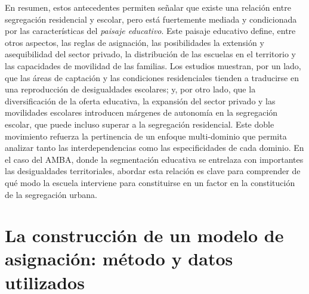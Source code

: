 \documentclass[
  spanish,
  a4paper,%
  chapterprefix=true,%
  DIV=calc,%
  twoside]{scrbook}%
\begin{document}
En resumen, estos antecedentes permiten señalar que existe una relación
entre segregación residencial y escolar, pero está fuertemente mediada y
condicionada por las características del \emph{paisaje educativo}. Este
paisaje educativo define, entre otros aspectos, las reglas de
asignación, las posibilidades la extensión y asequibilidad del sector
privado, la distribución de las escuelas en el territorio y las
capacidades de movilidad de las familias. Los estudios muestran, por un
lado, que las áreas de captación y las condiciones residenciales tienden
a traducirse en una reproducción de desigualdades escolares; y, por otro
lado, que la diversificación de la oferta educativa, la expansión del
sector privado y las movilidades escolares introducen márgenes de
autonomía en la segregación escolar, que puede incluso superar a la
segregación residencial. Este doble movimiento refuerza la pertinencia
de un enfoque multi-dominio que permita analizar tanto las
interdependencias como las especificidades de cada dominio. En el caso
del AMBA, donde la segmentación educativa se entrelaza con importantes
las desigualdades territoriales, abordar esta relación es clave para
comprender de qué modo la escuela interviene para constituirse en un
factor en la constitución de la segregación urbana.

\section{La construcción de un modelo de asignación: método y datos utilizados}\label{school-method}
\end{document}
